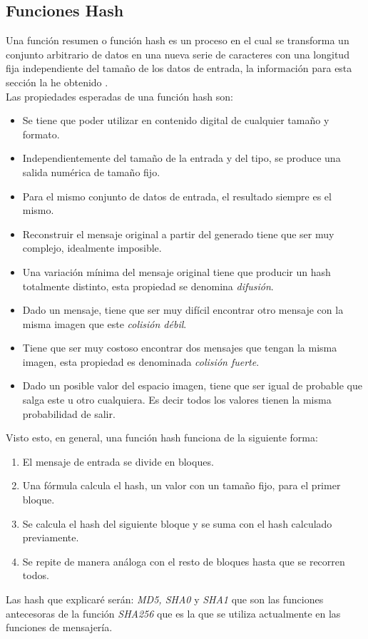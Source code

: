 \begin{aligned*}
\section{Funciones Hash}
Una función resumen o función hash es un proceso en el cual se transforma un conjunto arbitrario de datos en una nueva serie de caracteres con una longitud fija independiente del tamaño de los datos de entrada, la información para esta sección la he obtenido \cite{aepd}.\\
Las propiedades esperadas de una función hash son:\\
\begin{itemize}
	\item Se tiene que poder utilizar en contenido digital de cualquier tamaño y formato.
	\item Independientemente del tamaño de la entrada y del tipo, se produce una salida numérica de tamaño fijo.
	\item Para el mismo conjunto de datos de entrada, el resultado siempre es el mismo.
	\item Reconstruir el mensaje original a partir del generado tiene que ser muy complejo, idealmente imposible.
	\item Una variación mínima del mensaje original tiene que producir un hash totalmente distinto, esta propiedad se denomina \emph{difusión}.
	\item Dado un mensaje, tiene que ser muy difícil encontrar otro mensaje con la misma imagen que este \emph{colisión débil}.
	\item Tiene que ser muy costoso encontrar dos mensajes que tengan la misma imagen, esta propiedad es denominada \emph{colisión fuerte}.
	\item Dado un posible valor del espacio imagen, tiene que ser igual de probable que salga este u otro cualquiera. Es decir todos los valores tienen la misma probabilidad de salir.
\end{itemize}

Visto esto, en general, una función hash funciona de la siguiente forma:
\begin{enumerate}
	\item El mensaje de entrada se divide en bloques.
	\item Una fórmula calcula el hash, un valor con un tamaño fijo, para el primer bloque.
	\item Se calcula el hash del siguiente bloque y se suma con el hash calculado previamente.
	\item Se repite de manera análoga con el resto de bloques hasta que se recorren todos.
\end{enumerate}
Las hash que explicaré serán: \emph{MD5, SHA0} y \emph{SHA1} que son las funciones antecesoras de la función \emph{SHA256} que es la que se utiliza actualmente en las funciones de mensajería.\\


\end{aligned*}
